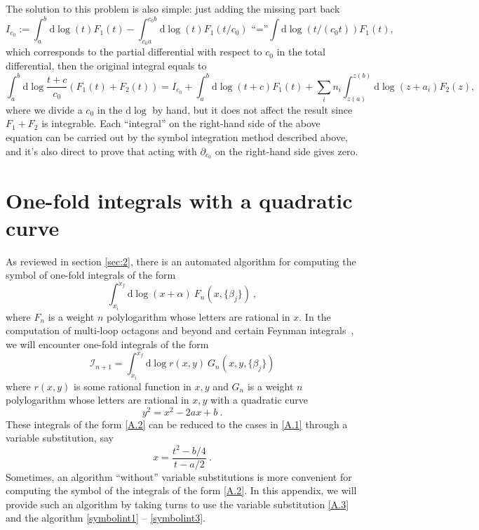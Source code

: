 \documentclass[a4paper,12pt]{article}
\newcommand{\dif}{\mathrm{d}} %
\begin{document}
The solution to this problem is also simple: just adding the missing part back
\[
    I_{c_0}:=\int_a^b \dif\log (t) F_1(t)-\int_{c_0a}^{c_0b} \dif\log (t) F_1(t/c_0)\,\,\text{``=''} \int \dif\log(t/(c_0t))F_1(t),
\]
which corresponds to the partial differential with respect to $c_0$ in the total differential, then the original integral equals to 
\[
    \int_a^b \dif\log \frac{t+c}{c_0} (F_1(t)+F_2(t))=I_{c_0}+\int_a^b \dif\log (t+c) F_1(t)+ \sum_{i} n_i\int_{z(a)}^{z(b)} \dif\log (z+a_i) F_2(z),
\]
where we divide a $c_0$ in the $\dif \log$ by hand, but it does not affect the result since $F_1+F_2$ is integrable. Each ``integral'' on the right-hand side of the above equation can be carried out by the symbol integration method described above, and it's also direct to prove that acting with $\partial_{c_0}$ on the right-hand side gives zero.

\section{One-fold integrals with a quadratic curve}

As reviewed in section \ref{sec:2}, there is an automated algorithm for computing the symbol of one-fold integrals of the form
\begin{equation}
    \int_{x_{i}}^{x_{f}} \dif \log(x+\alpha) \: F_{n}(x,\{\beta_{j}\}) \:,  \label{A.1}
\end{equation}
where $F_{n}$ is a weight $n$ polylogarithm whose letters are rational in $x$. In the computation of multi-loop octagons and beyond \cite{Zhang:2019vnm,He:2020vob} and certain Feynman integrals~\cite{He:2020lcu}, we will encounter one-fold integrals of the form
\begin{equation}
    \mathscr{I}_{n+1}=\int_{x_{i}}^{x_{f}} \dif \log r(x,y) \: G_{n}(x,y,\{\beta_{j}\})  \label{A.2}
\end{equation}
where $r(x,y)$ is some rational function in $x,y$ and $G_{n}$ is a weight $n$ polylogarithm whose letters are rational in $x,y$ with a quadratic curve \[
    y^{2}=x^{2}-2ax+b \:.
\] 
These integrals of the form \eqref{A.2} can be reduced to the cases in \eqref{A.1} through a variable substitution, say 
\begin{equation}
    x=\frac{t^{2}-b/4}{t-a/2}\:.  \label{A.3}
\end{equation}
Sometimes, an algorithm ``without'' variable substitutions is more convenient for computing the symbol of the integrals of the form \eqref{A.2}. In this appendix, we will provide such an algorithm by taking turns to use the variable substitution \eqref{A.3} and the algorithm \eqref{symbolint1} -- \eqref{symbolint3}.
\end{document}

